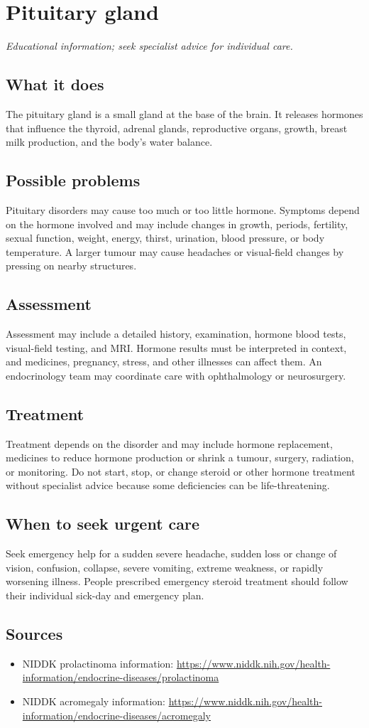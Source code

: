 \chapter{Pituitary gland}

\medskip
\noindent\textit{Educational information; seek specialist advice for individual care.}

\section*{What it does}
The pituitary gland is a small gland at the base of the brain. It releases hormones that influence the thyroid, adrenal glands, reproductive organs, growth, breast milk production, and the body’s water balance.

\section*{Possible problems}
Pituitary disorders may cause too much or too little hormone. Symptoms depend on the hormone involved and may include changes in growth, periods, fertility, sexual function, weight, energy, thirst, urination, blood pressure, or body temperature. A larger tumour may cause headaches or visual-field changes by pressing on nearby structures.

\section*{Assessment}
Assessment may include a detailed history, examination, hormone blood tests, visual-field testing, and MRI. Hormone results must be interpreted in context, and medicines, pregnancy, stress, and other illnesses can affect them. An endocrinology team may coordinate care with ophthalmology or neurosurgery.

\section*{Treatment}
Treatment depends on the disorder and may include hormone replacement, medicines to reduce hormone production or shrink a tumour, surgery, radiation, or monitoring. Do not start, stop, or change steroid or other hormone treatment without specialist advice because some deficiencies can be life-threatening.

\section*{When to seek urgent care}
Seek emergency help for a sudden severe headache, sudden loss or change of vision, confusion, collapse, severe vomiting, extreme weakness, or rapidly worsening illness. People prescribed emergency steroid treatment should follow their individual sick-day and emergency plan.

\section*{Sources}
\begin{itemize}
\item NIDDK prolactinoma information: \url{https://www.niddk.nih.gov/health-information/endocrine-diseases/prolactinoma}
\item NIDDK acromegaly information: \url{https://www.niddk.nih.gov/health-information/endocrine-diseases/acromegaly}
\end{itemize}
